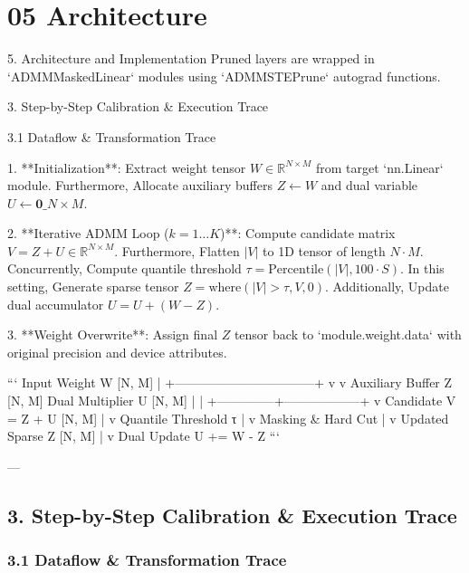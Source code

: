 \section{05 Architecture}

 5. Architecture and Implementation
Pruned layers are wrapped in `ADMMMaskedLinear` modules using `ADMMSTEPrune` autograd functions.


 3. Step-by-Step Calibration \& Execution Trace


 3.1 Dataflow \& Transformation Trace

1. **Initialization**:
Extract weight tensor $W \in \mathbb{R}^{N \times M}$ from target `nn.Linear` module. Furthermore, Allocate auxiliary buffers $Z \leftarrow W$ and dual variable $U \leftarrow \mathbf{0}\_{N \times M}$.

2. **Iterative ADMM Loop ($k = 1 \dots K$)**:
Compute candidate matrix $V = Z + U \in \mathbb{R}^{N \times M}$. Furthermore, Flatten $|V|$ to 1D tensor of length $N \cdot M$. Concurrently, Compute quantile threshold $\tau = \text{Percentile}(|V|, 100 \cdot S)$. In this setting, Generate sparse tensor $Z = \text{where}(|V| > \tau, V, 0)$. Additionally, Update dual accumulator $U = U + (W - Z)$.

3. **Weight Overwrite**:
Assign final $Z$ tensor back to `module.weight.data` with original precision and device attributes.


```
Input Weight W [N, M]
       |
       +---------------------------------+
       v                                 v
Auxiliary Buffer Z [N, M]      Dual Multiplier U [N, M]
       |                                 |
       +--------------+------------------+
                      v
            Candidate V = Z + U [N, M]
                      |
                      v
           Quantile Threshold τ
                      |
                      v
             Masking \& Hard Cut
                      |
                      v
           Updated Sparse Z [N, M]
                      |
                      v
            Dual Update U += W - Z
```

---



\subsection{3. Step-by-Step Calibration \& Execution Trace}
\subsubsection{3.1 Dataflow \& Transformation Trace}

